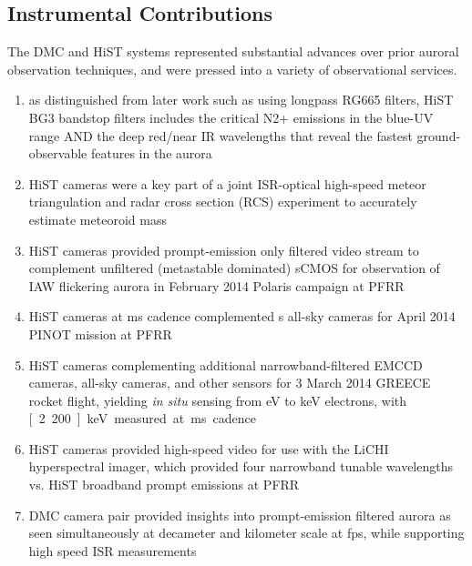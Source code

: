 \subsection{Instrumental Contributions}
The DMC and HiST systems represented substantial advances over prior auroral observation techniques, and were pressed into a variety of observational services.
\begin{enumerate}
	
	\item as distinguished from later work such as \citet{kataoka2016high} using longpass RG665 filters, HiST BG3 bandstop filters includes the critical N2+ emissions in the blue-UV range AND the deep red/near IR wavelengths that reveal the fastest ground-observable features in the aurora
	
	\item HiST cameras were a key part of a joint ISR-optical high-speed meteor triangulation and radar cross section (RCS) experiment to accurately estimate meteoroid mass \citep{limonta}
	
	\item HiST cameras provided prompt-emission only filtered video stream to complement unfiltered (metastable dominated) sCMOS for observation of IAW flickering aurora in February 2014 Polaris campaign at PFRR \citep{kataoka2015,fukuda2016}
	
	\item HiST cameras at \unit[20]{ms} cadence complemented \unit[13]{s} all-sky cameras for April 2014 PINOT mission at PFRR \citep{fallen2014,nishimura2014,makarevich2014}
	
	\item HiST cameras complementing additional narrowband-filtered EMCCD cameras, all-sky cameras, and other sensors for 3 March 2014 GREECE rocket flight, yielding \textit{in situ} sensing from \unit[300]{eV} to \unit[200]{keV} electrons, with \unit[2..200]{keV} measured at \unit[100]{ms} cadence \citep{michell2014agu,samara2014,grubbs2014,ogasawara2014,ogasawara2016,ogasawara2016a}
	
	\item HiST cameras provided high-speed video for use with the LiCHI hyperspectral imager, which provided four narrowband tunable wavelengths vs. HiST broadband prompt emissions at PFRR \citep{goenka2016,goenka2015,goenka2014}
	
	\item DMC camera pair provided insights into prompt-emission filtered aurora as seen simultaneously at decameter and kilometer scale at \unit[30]{fps}, while supporting high speed ISR measurements \citep{vierinen2016}
    
\end{enumerate}


